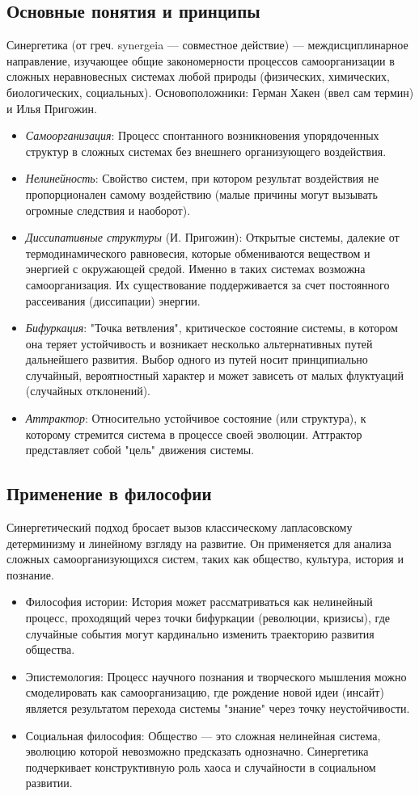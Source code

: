 \documentclass[12pt,a4paper]{article}
\begin{document}
	\subsection{Основные понятия и принципы}
	Синергетика (от греч. synergeia --- совместное действие) --- междисциплинарное направление, изучающее общие закономерности процессов самоорганизации в сложных неравновесных системах любой природы (физических, химических, биологических, социальных). Основоположники: Герман Хакен (ввел сам термин) и Илья Пригожин.
	\begin{itemize}
		\item \textit{Самоорганизация}: Процесс спонтанного возникновения упорядоченных структур в сложных системах без внешнего организующего воздействия.
		\item \textit{Нелинейность}: Свойство систем, при котором результат воздействия не пропорционален самому воздействию (малые причины могут вызывать огромные следствия и наоборот).
		\item \textit{Диссипативные структуры} (И. Пригожин): Открытые системы, далекие от термодинамического равновесия, которые обмениваются веществом и энергией с окружающей средой. Именно в таких системах возможна самоорганизация. Их существование поддерживается за счет постоянного рассеивания (диссипации) энергии.
		\item \textit{Бифуркация}: "Точка ветвления", критическое состояние системы, в котором она теряет устойчивость и возникает несколько альтернативных путей дальнейшего развития. Выбор одного из путей носит принципиально случайный, вероятностный характер и может зависеть от малых флуктуаций (случайных отклонений).
		\item \textit{Аттрактор}: Относительно устойчивое состояние (или структура), к которому стремится система в процессе своей эволюции. Аттрактор представляет собой "цель" движения системы.
	\end{itemize}
	
	\subsection{Применение в философии}
	Синергетический подход бросает вызов классическому лапласовскому детерминизму и линейному взгляду на развитие. Он применяется для анализа сложных самоорганизующихся систем, таких как общество, культура, история и познание.
	\begin{itemize}
		\item Философия истории: История может рассматриваться как нелинейный процесс, проходящий через точки бифуркации (революции, кризисы), где случайные события могут кардинально изменить траекторию развития общества.
		\item Эпистемология: Процесс научного познания и творческого мышления можно смоделировать как самоорганизацию, где рождение новой идеи (инсайт) является результатом перехода системы "знание" через точку неустойчивости.
		\item Социальная философия: Общество --- это сложная нелинейная система, эволюцию которой невозможно предсказать однозначно. Синергетика подчеркивает конструктивную роль хаоса и случайности в социальном развитии.
	\end{itemize}
	
\end{document}
